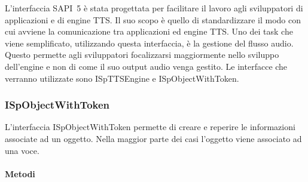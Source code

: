 L'interfaccia SAPI~5 è stata progettata per facilitare il lavoro agli sviluppatori di applicazioni e di engine TTS. Il suo scopo è quello di standardizzare il modo con cui avviene la comunicazione tra applicazioni ed engine TTS. Uno dei task che viene semplificato, utilizzando questa interfaccia, è la gestione del flusso audio. Questo permette agli sviluppatori focalizzarsi maggiormente nello sviluppo dell'engine e non di come il suo output audio venga gestito.
Le interfacce che verranno utilizzate sono ISpTTSEngine e ISpObjectWithToken.
     \subsubsection{ISpObjectWithToken}
     L'interfaccia ISpObjectWithToken permette di creare e reperire le informazioni associate ad un oggetto. Nella maggior parte dei casi l'oggetto viene associato ad una voce.
     \\\\
     \textbf{Metodi}

